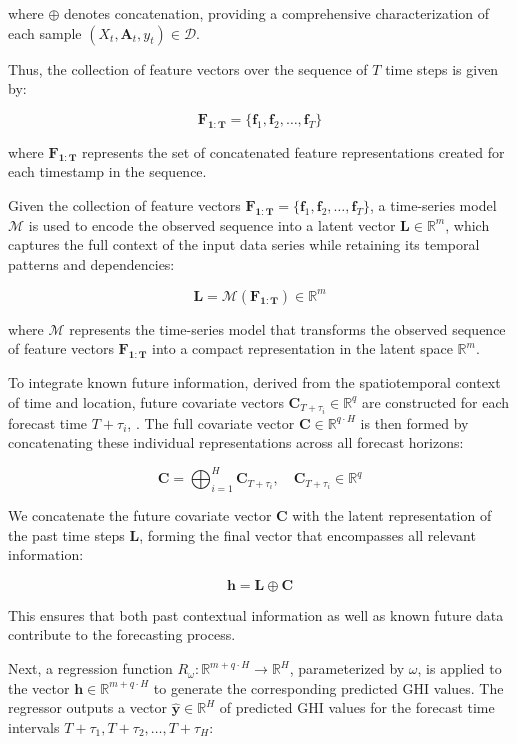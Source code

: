 where \( \oplus \) denotes concatenation, providing a comprehensive characterization of each sample \( (X_t, \mathbf{A}_t, y_t) \in \mathcal{D} \).

Thus, the collection of feature vectors over the sequence of \( T \) time steps is given by:

\[
\mathbf{F_{1:T}} = \{ \mathbf{f}_1, \mathbf{f}_2, \dots, \mathbf{f}_T \}
\]

where \( \mathbf{F_{1:T}} \) represents the set of concatenated feature representations created for each timestamp in the sequence.

Given the collection of feature vectors \( \mathbf{F_{1:T}} = \{ \mathbf{f}_1, \mathbf{f}_2, \dots, \mathbf{f}_T \} \), a time-series model \( \mathcal{M} \) is used to encode the observed sequence into a latent vector \( \mathbf{L} \in \mathbb{R}^m \), which captures the full context of the input data series while retaining its temporal patterns and dependencies:

\[
\mathbf{L} = \mathcal{M}(\mathbf{F_{1:T}}) \in \mathbb{R}^m
\]

where \( \mathcal{M} \) represents the time-series model that transforms the observed sequence of feature vectors \( \mathbf{F_{1:T}} \) into a compact representation in the latent space \(\mathbb{R}^m \).


To integrate known future information, derived from the spatiotemporal context of time and location, future covariate vectors \( \mathbf{C}_{T+\tau_i} \in \mathbb{R}^{q} \) are constructed for each forecast time \( T + \tau_i \), . The full covariate vector \( \mathbf{C} \in \mathbb{R}^{q \cdot H} \) is then formed by concatenating these individual representations across all forecast horizons:

\[
\mathbf{C} = \bigoplus_{i=1}^{H} \mathbf{C}_{T+\tau_i}, \quad \mathbf{C}_{T+\tau_i} \in \mathbb{R}^{q}
\]

We concatenate the future covariate vector \( \mathbf{C} \) with the latent representation of the past time steps \( \mathbf{L} \), forming the final vector that encompasses all relevant information:

\[
\mathbf{h} = \mathbf{L} \oplus \mathbf{C}
\]

This ensures that both past contextual information as well as known future data contribute to the forecasting process.

Next, a regression function \( R_\omega: \mathbb{R}^{m+q \cdot H} \to \mathbb{R}^H \), parameterized by \( \omega \), is applied to the vector \( \mathbf{h} \in \mathbb{R}^{m+q \cdot H}\) to generate the corresponding predicted GHI values. The regressor outputs a vector \( \hat{\mathbf{y}} \in \mathbb{R}^H \) of predicted GHI values for the forecast time intervals \( T + \tau_1, T + \tau_2, \dots, T + \tau_H \):

